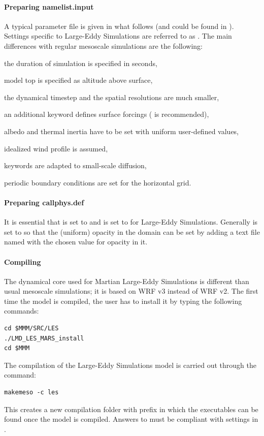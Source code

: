 \paragraph{Preparing namelist.input} A typical parameter file  is given in what follows (and could be found in ). Settings specific to Large-Eddy Simulations are referred to as . The main differences with regular mesoscale simulations are the following: 
\begin{citemize}
\item the duration of simulation is specified in seconds, 
\item model top is specified as altitude above surface, 
\item the dynamical timestep and the spatial resolutions are much smaller,
\item an additional  keyword defines surface forcings ( is recommended),
\item albedo and thermal inertia have to be set with uniform user-defined values,
\item idealized wind profile is assumed,
\item {} keywords are adapted to small-scale diffusion,
\item periodic boundary conditions are set for the horizontal grid.
\end{citemize}

\scriptsize
{}
\normalsize

\newpage

\paragraph{Preparing callphys.def} It is essential that  is set to  and  is set to  for Large-Eddy Simulations. Generally  is set to  so that the (uniform) opacity in the domain can be set by adding a text file named  with the chosen value for opacity in it.

\paragraph{Compiling} The dynamical core used for Martian Large-Eddy Simulations is different than usual mesoscale simulations; it is based on WRF v3 instead of WRF v2. The first time the model is compiled, the user has to install it by typing the following commands:
\begin{verbatim}
cd $MMM/SRC/LES
./LMD_LES_MARS_install
cd $MMM
\end{verbatim}
The compilation of the Large-Eddy Simulations model is carried out through the command: 
\begin{verbatim}
makemeso -c les 
\end{verbatim}
This creates a new compilation folder with prefix  in which the executables can be found once the model is compiled. Answers to  must be compliant with settings in .


